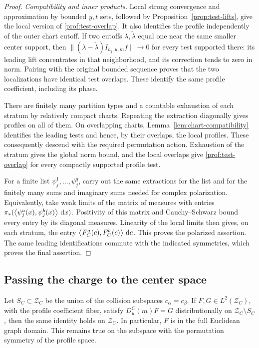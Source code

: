 \begin{proof}
\smallskip\noindent\emph{Compatibility and inner products.}
Local strong convergence and approximation by bounded \(y,t\) sets,
followed by Proposition~\ref{prop:test-lifts}, give the local version of
\eqref{prof:test-overlap}. It also identifies the profile independently
of the outer chart cutoff. If two cutoffs \(\lambda,\widetilde\lambda\)
equal one near the same smaller center support, then
\(\| (\lambda-\widetilde\lambda)I_{h_j,u,m}f\|\to0\) for every test
supported there: its leading lift concentrates in that neighborhood,
and its correction tends to zero in norm. Pairing with the original
bounded sequence proves that the two localizations have identical test
overlaps. These identify the same profile coefficient, including its phase.

There are finitely many partition types and a countable exhaustion of each
stratum by relatively compact charts. Repeating the extraction diagonally
gives profiles on all of them. On overlapping charts,
Lemma~\ref{lem:chart-compatibility} identifies the leading tests and hence,
by their overlaps, the local profiles. These consequently descend with
the required permutation action. Exhaustion of the stratum gives the
global norm bound, and the local overlaps give
\eqref{prof:test-overlap} for every compactly supported profile test.

For a finite list \(\psi_j^1,\ldots,\psi_j^q\), carry out the same
extractions for the list and for the finitely many sums and imaginary
sums needed for complex polarization. Equivalently, take weak limits of
the matrix of measures with entries
\(\pi_*(\left\langle \psi_j^a(x),\psi_j^b(x)\right\rangle\,\mathrm d x)\). Positivity of this matrix
and Cauchy--Schwarz bound every entry by its diagonal measures. Linearity
of the local limits then gives, on each stratum, the entry
\(\left\langle F_C^a(c),F_C^b(c)\right\rangle\,\mathrm d c\). This proves the polarized assertion.
The same leading identifications commute with the indicated symmetries,
which proves the final assertion.
\end{proof}

\subsection{Passing the charge to the center space}

\begin{lemma}\label{lem:collision-removal}
Let \(S_C\subset \mathcal Z_C\) be the union of the collision subspaces
\(c_\alpha=c_\beta\). If \(F,G\in L^2(\mathcal Z_C)\), with the profile coefficient
fiber, satisfy \(D_u^C(m)F=G\) distributionally on \(\mathcal Z_C\setminus S_C\),
then the same identity holds on \(\mathcal Z_C\). In particular, \(F\) is in the
full Euclidean graph domain. This remains true on the subspace with the
permutation symmetry of the profile space.
\end{lemma}

